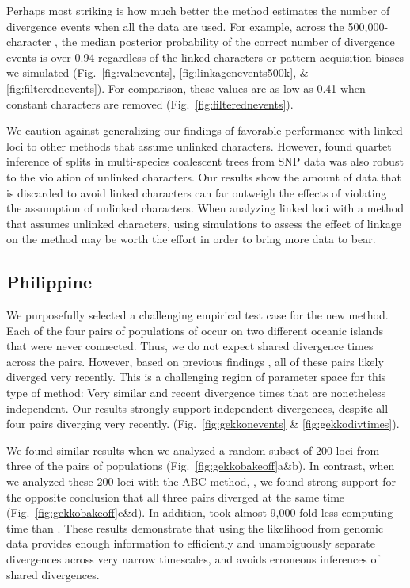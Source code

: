 Perhaps most striking is how much better the method estimates the number
of divergence events when all the data are used.
For example, across the 500,000-character \datasets, the
median posterior probability of the correct number of divergence events
is over 0.94 regardless of the linked characters
or pattern-acquisition biases we simulated
(Fig.\ 
\ref{fig:valnevents},
\ref{fig:linkagenevents500k},
\&
\ref{fig:filterednevents}).
For comparison,
these values are as low as 0.41 when constant characters are removed
(Fig.~\ref{fig:filterednevents}).

We caution against generalizing our findings
of favorable performance with linked loci
to other methods that assume unlinked characters.
However, 
\citet{ChifmanKubatko2014}
found quartet inference of splits in multi-species coalescent trees
from SNP data was also robust to the violation of unlinked characters.
Our results show the amount of data that is discarded to avoid linked
characters can far outweigh the effects of violating the assumption of
unlinked characters.
When analyzing linked loci with a method that assumes unlinked characters,
using simulations to assess the effect of linkage on the method may be worth
the effort in order to bring more data to bear.


\subsection{Philippine }
We purposefully selected a challenging empirical test case for the new method.
Each of the four pairs of populations of \spp{Gekko} occur on two different
oceanic islands that were never connected.
Thus, we do not expect shared divergence times across the pairs.
However, based on previous findings \citep{Siler2012, Siler2014kikuchii}, all
of these pairs likely diverged very recently.
This is a challenging region of parameter space for this type of method: Very
similar and recent divergence times that are nonetheless independent.
Our results strongly support independent divergences, despite all four pairs
diverging very recently.
(Fig.\ 
\ref{fig:gekkonevents}
\& 
\ref{fig:gekkodivtimes}).

We found similar results when we analyzed a random subset of 200 loci from
three of the pairs of  populations
(Fig.~\ref{fig:gekkobakeoff}a\&b).
In contrast, when we analyzed these 200 loci with the ABC method, \dppmsbayes,
we found strong support for the opposite conclusion that all three pairs
diverged at the same time
(Fig.~\ref{fig:gekkobakeoff}c\&d).
In addition, \ecoevolity took almost 9,000-fold less computing time than
\dppmsbayes.
These results demonstrate that using the likelihood from genomic data provides
enough information to efficiently and unambiguously separate divergences across
very narrow timescales, and avoids erroneous inferences of shared divergences.


